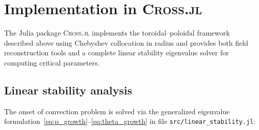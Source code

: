 \documentclass[11pt]{article}
\numberwithin{equation}{section}
\begin{document}
\section{Implementation in \textsc{Cross.jl}}
The Julia package \textsc{Cross.jl} implements the toroidal--poloidal framework described above using Chebyshev collocation in radius and provides both field reconstruction tools and a complete linear stability eigenvalue solver for computing critical parameters.

\subsection{Linear stability analysis}
The onset of convection problem is solved via the generalized eigenvalue formulation~\eqref{eq:p_growth}--\eqref{eq:theta_growth} in file \texttt{src/linear\_stability.jl}:
\end{document}
